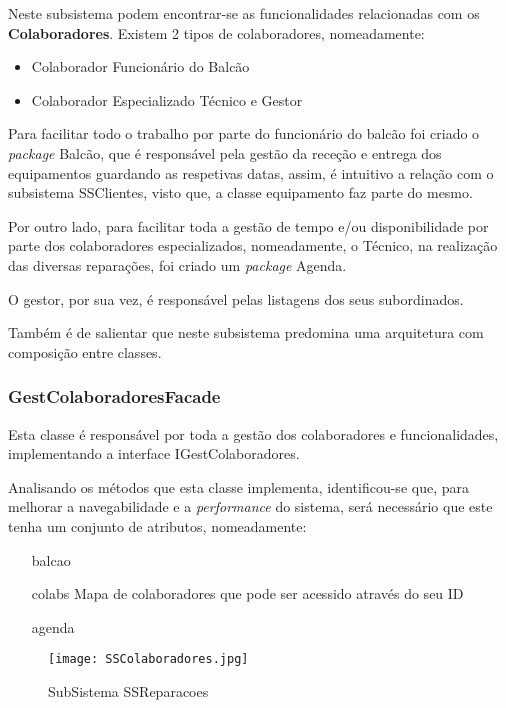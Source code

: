 \documentclass[../../relatorio.tex]{subfiles}
\begin{document}
Neste subsistema podem encontrar-se as funcionalidades relacionadas com os \textbf{Colaboradores}.
Existem 2 tipos de colaboradores, nomeadamente:
\begin{itemize}
    \item Colaborador Funcionário do Balcão
    \item Colaborador Especializado Técnico e Gestor
\end{itemize}

Para facilitar todo o trabalho por parte do funcionário do balcão foi criado o \textit{package} Balcão, que é responsável pela gestão da
receção e entrega dos equipamentos guardando as respetivas datas, assim, é intuitivo a relação com o subsistema SSClientes, visto que,
a classe equipamento faz parte do mesmo.

Por outro lado, para facilitar toda a gestão de tempo e/ou disponibilidade por parte dos colaboradores especializados, nomeadamente, o Técnico, na realização das 
diversas reparações, foi criado um \textit{package} Agenda. 

O gestor, por sua vez, é responsável pelas listagens dos seus subordinados.

Também é de salientar que neste subsistema predomina uma arquitetura com composição entre classes.

\subsubsection{GestColaboradoresFacade}
Esta classe é responsável por toda a gestão dos colaboradores e funcionalidades, implementando a interface IGestColaboradores.

Analisando os métodos que esta classe implementa, identificou-se que, para melhorar a navegabilidade
e a \textit{performance} do sistema, será necessário que este tenha um conjunto de atributos, nomeadamente:
\begin{itemize}
    \item [balcao]
    \item [colabs]{Mapa de colaboradores que pode ser acessido através do seu ID}
    \item [agenda]
\end{itemize}

\begin{figure}[!ht]
    \centering
    \texttt{[image: SSColaboradores.jpg]}
    \caption{SubSistema SSReparacoes}
\end{figure}
\end{document}
